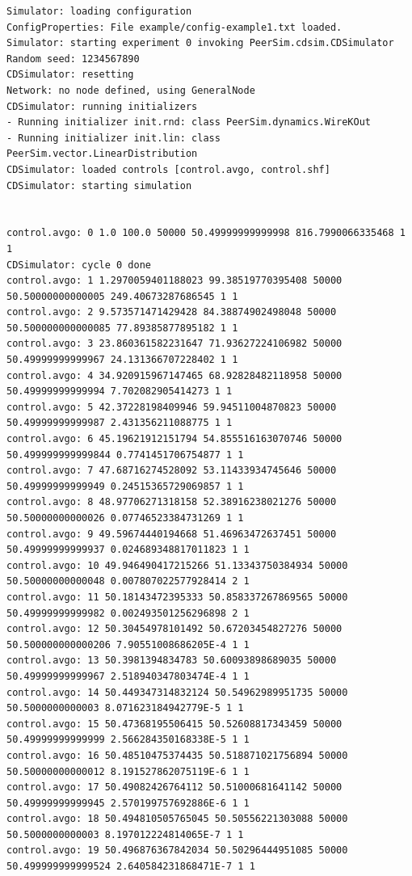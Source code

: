 \documentclass[a4paper,11pt]{article}
\begin{document}
\tiny
\begin{verbatim}
Simulator: loading configuration
ConfigProperties: File example/config-example1.txt loaded.
Simulator: starting experiment 0 invoking PeerSim.cdsim.CDSimulator
Random seed: 1234567890
CDSimulator: resetting
Network: no node defined, using GeneralNode
CDSimulator: running initializers
- Running initializer init.rnd: class PeerSim.dynamics.WireKOut
- Running initializer init.lin: class PeerSim.vector.LinearDistribution
CDSimulator: loaded controls [control.avgo, control.shf]
CDSimulator: starting simulation


control.avgo: 0 1.0 100.0 50000 50.49999999999998 816.7990066335468 1 1
CDSimulator: cycle 0 done
control.avgo: 1 1.2970059401188023 99.38519770395408 50000 50.50000000000005 249.40673287686545 1 1
control.avgo: 2 9.573571471429428 84.38874902498048 50000 50.500000000000085 77.89385877895182 1 1
control.avgo: 3 23.860361582231647 71.93627224106982 50000 50.49999999999967 24.131366707228402 1 1
control.avgo: 4 34.920915967147465 68.92828482118958 50000 50.49999999999994 7.702082905414273 1 1
control.avgo: 5 42.37228198409946 59.94511004870823 50000 50.49999999999987 2.431356211088775 1 1
control.avgo: 6 45.19621912151794 54.855516163070746 50000 50.499999999999844 0.7741451706754877 1 1
control.avgo: 7 47.68716274528092 53.11433934745646 50000 50.49999999999949 0.24515365729069857 1 1
control.avgo: 8 48.97706271318158 52.38916238021276 50000 50.50000000000026 0.07746523384731269 1 1
control.avgo: 9 49.59674440194668 51.46963472637451 50000 50.49999999999937 0.024689348817011823 1 1
control.avgo: 10 49.946490417215266 51.13343750384934 50000 50.50000000000048 0.007807022577928414 2 1
control.avgo: 11 50.18143472395333 50.858337267869565 50000 50.49999999999982 0.002493501256296898 2 1
control.avgo: 12 50.30454978101492 50.67203454827276 50000 50.500000000000206 7.90551008686205E-4 1 1
control.avgo: 13 50.3981394834783 50.60093898689035 50000 50.49999999999967 2.518940347803474E-4 1 1
control.avgo: 14 50.449347314832124 50.54962989951735 50000 50.5000000000003 8.071623184942779E-5 1 1
control.avgo: 15 50.47368195506415 50.52608817343459 50000 50.49999999999999 2.566284350168338E-5 1 1
control.avgo: 16 50.48510475374435 50.518871021756894 50000 50.50000000000012 8.191527862075119E-6 1 1
control.avgo: 17 50.49082426764112 50.51000681641142 50000 50.49999999999945 2.570199757692886E-6 1 1
control.avgo: 18 50.494810505765045 50.50556221303088 50000 50.5000000000003 8.197012224814065E-7 1 1
control.avgo: 19 50.496876367842034 50.50296444951085 50000 50.499999999999524 2.640584231868471E-7 1 1

\end{verbatim}
\end{document}
